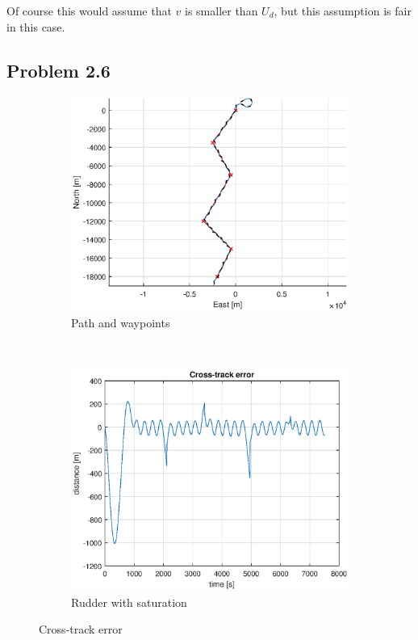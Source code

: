 Of course this would assume that $v$ is smaller than $U_d$, but this assumption is fair in this case. 

\subsection*{Problem 2.6}

\begin{figure}[ht]
	\begin{subfigure}[b]{0.4\textwidth}
		\includegraphics[width=\textwidth]{path_2_6}
		\caption{Path and waypoints}
		\label{fig:path_2_6}
	\end{subfigure}%
        ~
	\begin{subfigure}[b]{0.4\textwidth}
		\includegraphics[width=\textwidth]{cross_track_error2_6}
		\caption{Rudder with saturation}
		\label{fig:cross_track_error2_6}
	\end{subfigure}
	\caption{Cross-track error}
	\label{fig:task2_6}
\end{figure}

